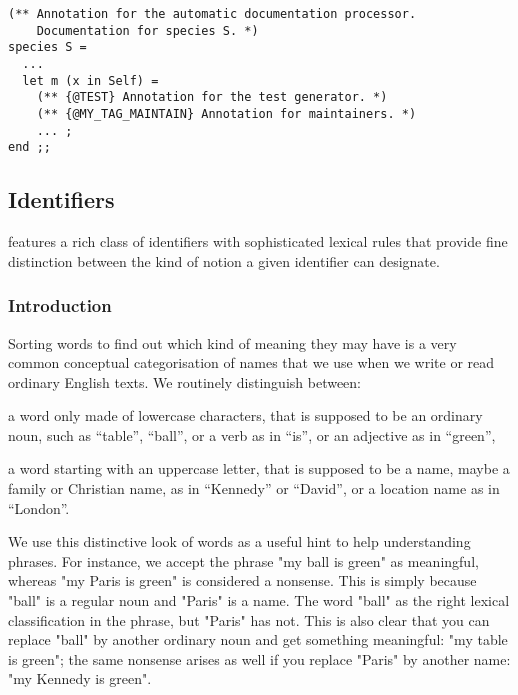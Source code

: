 {\scriptsize
\begin{lstlisting}
(** Annotation for the automatic documentation processor.
    Documentation for species S. *)
species S =
  ...
  let m (x in Self) =
    (** {@TEST} Annotation for the test generator. *)
    (** {@MY_TAG_MAINTAIN} Annotation for maintainers. *)
    ... ;
end ;;
\end{lstlisting}
}

\subsection{Identifiers}
\vspace{0.2cm}

{\focal} features a rich class of identifiers with sophisticated lexical
rules that provide fine distinction between the kind of notion a given
identifier can designate.

\subsubsection{Introduction}

Sorting words to find out which kind of meaning they may have is a very common
conceptual categorisation of names that we use when we write or read ordinary
English texts. We routinely distinguish between:
\begin{citemize}
\item a word only made of lowercase characters, that is supposed to be an
  ordinary noun, such as ``table'', ``ball'', or a verb as in ``is'', or an
  adjective as in ``green'',
\item a word starting with an uppercase letter, that is supposed to be a name,
  maybe a family or Christian name, as in ``Kennedy'' or ``David'', or a location
  name as in ``London''.
\end{citemize}

We use this distinctive look of words as a useful hint to help understanding
phrases. For instance, we accept the phrase "my ball is green" as meaningful,
whereas "my Paris is green" is considered a nonsense. This is simply because
"ball" is a regular noun and "Paris" is a name. The word "ball" as the right
lexical classification in the phrase, but "Paris" has not. This is also clear
that you can replace "ball" by another ordinary noun and get something
meaningful: "my table is green"; the same nonsense arises as well if you
replace "Paris" by another name: "my Kennedy is green".

